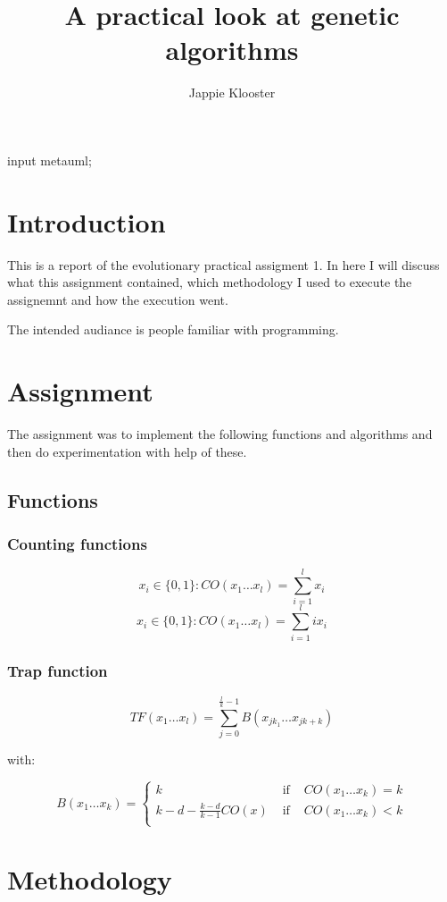 \documentclass{article}
\begin{document}
\begin{empfile}
\begin{empcmds}
input metauml;
\end{empcmds}
\author{Jappie Klooster}
\title{A practical look at genetic algorithms}
\maketitle

\section{Introduction}
This is a report of the evolutionary practical assigment 1.
In here I will discuss what this assignment contained, which
methodology I used to execute the assignemnt and how the execution
went.

The intended audiance is people familiar with programming.

\section{Assignment}
The assignment was to implement the following functions and algorithms and
then do experimentation with help of these.

\subsection{Functions}
\subsubsection{Counting functions}
\[x_i \in \{0,1\}:CO(x_1\dots x_l)=\sum^l_{i=1}x_i\]
\[x_i \in \{0,1\}:CO(x_1\dots x_l)=\sum^l_{i=1}i x_i\]
\subsubsection{Trap function}
\[TF(x_1\dots x_l) = \sum^{\frac{l}{k}-1}_{j=0}B(x_{jk_1}\dots x_{jk+k})\]

with:

\[B(x_1\dots x_k)=\left\{
	\begin{matrix}
		k & \mbox{ if } &   CO(x_1\dots x_k) = k \\
		k - d - \frac{k-d}{k-1} CO(x) & \mbox{ if } & CO(x_1\dots x_k) < k \\
	\end{matrix}
\right. \]
\section{Methodology}

\end{empfile}
\end{document}
